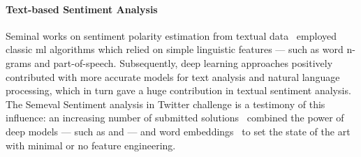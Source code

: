 \paragraph{Text-based Sentiment Analysis}
Seminal works on sentiment polarity estimation from textual data~\cite{go2009twitter,bermingham2010classifying} employed classic \gls{ml} algorithms which relied on simple linguistic features --- such as word n-grams and part-of-speech.
Subsequently, deep learning approaches positively contributed with more accurate models for text analysis and natural language processing, which in turn gave a huge contribution in textual sentiment analysis.
The Semeval Sentiment analysis in Twitter \cite{nakov2016semeval} challenge is a testimony of this influence: an increasing number of submitted solutions~\cite{deriu2016swisscheese,rouvier2016sensei} combined the power of deep models --- such as  and  --- and word embeddings~\cite{mikolov2013distributed,pennington2014glove} to set the state of the art with minimal or no feature engineering.


